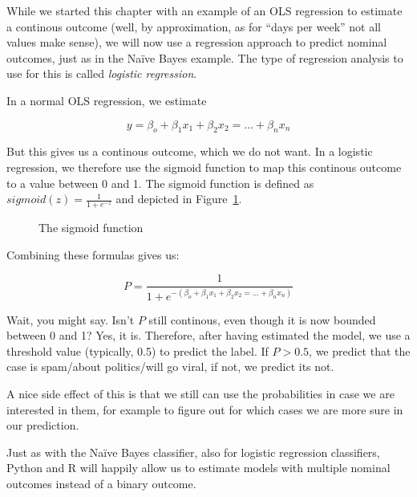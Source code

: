 While we started this chapter with an example of an OLS regression to estimate a
continous outcome (well, by approximation, as for ``days per week'' not all values make sense), we will now use a regression approach to predict nominal outcomes, just as in the Na\"ive Bayes example.
The type of regression analysis to use for this is called \emph{logistic regression}.

In a normal OLS regression, we estimate

$$y = \beta_o + \beta_1 x_1 + \beta_2 x_2 = \ldots + \beta_n x_n$$

But this gives us a continous outcome, which we do not want. In a logistic regression, we therefore use the sigmoid function to map this continous outcome to a value between 0 and 1. The sigmoid function is defined as
$sigmoid(z) = \frac{1}{1 + e^{-z}}$
and depicted in Figure~\ref{fig:sigmoid}.

\begin{figure}
  \centering
{}
\caption{\label{fig:sigmoid} The sigmoid function}
\end{figure}


Combining these formulas gives us:

$$P = \frac{1}{1 + e^{-(\beta_o + \beta_1 x_1 + \beta_2 x_2 = \ldots + \beta_n x_n)}} $$


Wait, you might say. Isn't $P$ still continous, even though it is now bounded between 0 and 1? Yes, it is.
Therefore, after having estimated the model, we use a threshold value (typically, 0.5)
to predict the label. If $P>0.5$, we predict that the case is spam/about politics/will go viral, if not, we predict its not.

A nice side effect of this is that we still can use the probabilities in case we are interested in them, for example to figure out for which cases we are more sure in our prediction.

Just as with the Na\"ive Bayes classifier, also for logistic regression classifiers, Python and R will happily allow us to estimate models with multiple nominal outcomes instead of a binary outcome.


